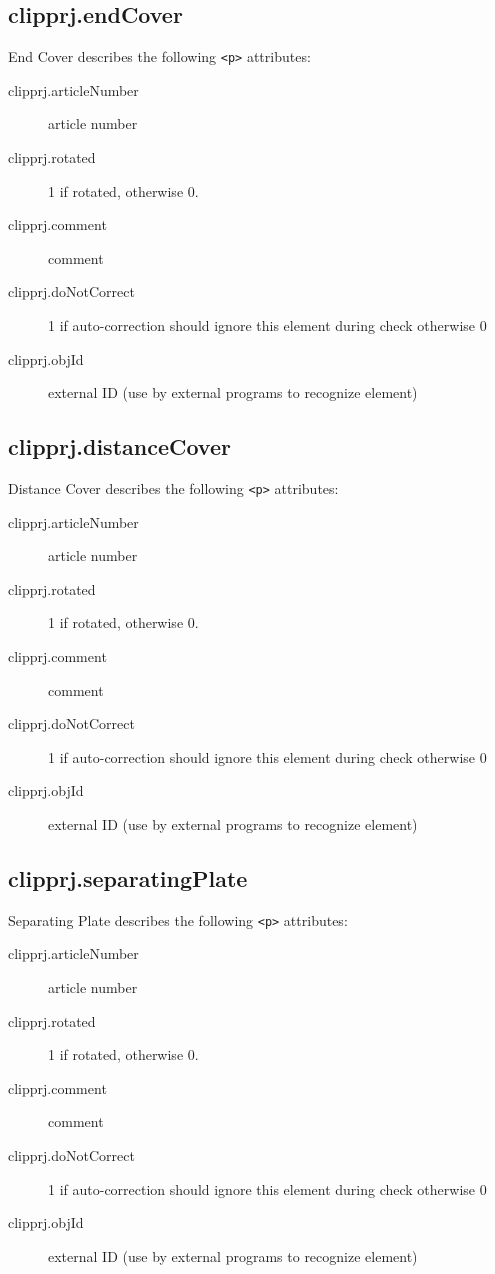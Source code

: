 \documentclass[%
	a4paper,
	oneside,
	listof=numbered,
	parskip=half,
	headsepline=true,
	footsepline=false,
	normalheadings,
	0.7headlines,
	headexclude,
	]{scrbook}
\begin{document}
\subsection{clipprj.endCover}
 
End Cover describes the following \verb|<p>| attributes: 

\begin{description}
	\item[clipprj.articleNumber] article number 
	\item[clipprj.rotated] 1 if rotated, otherwise 0. 
	\item[clipprj.comment] comment 
	\item[clipprj.doNotCorrect] 1 if auto-correction should ignore this element during check otherwise 0 
	\item[clipprj.objId] external ID (use by external programs to recognize element) 
\end{description}

\subsection{clipprj.distanceCover}
 
Distance Cover describes the following \verb|<p>| attributes: 

\begin{description}
	\item[clipprj.articleNumber] article number 
	\item[clipprj.rotated] 1 if rotated, otherwise 0. 
	\item[clipprj.comment] comment 
	\item[clipprj.doNotCorrect] 1 if auto-correction should ignore this element during check otherwise 0 
	\item[clipprj.objId] external ID (use by external programs to recognize element) 
\end{description}

\subsection{clipprj.separatingPlate}
 
Separating Plate describes the following \verb|<p>| attributes: 

\begin{description}
	\item[clipprj.articleNumber] article number 
	\item[clipprj.rotated] 1 if rotated, otherwise 0. 
	\item[clipprj.comment] comment 
	\item[clipprj.doNotCorrect] 1 if auto-correction should ignore this element during check otherwise 0 
	\item[clipprj.objId] external ID (use by external programs to recognize element) 
\end{description}
\end{document}
